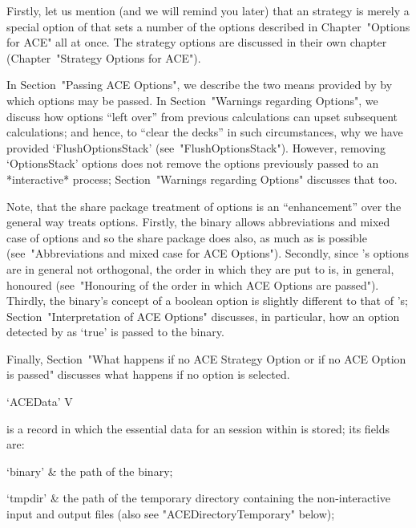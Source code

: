 Firstly, let us mention (and we will remind you later) that an  {\ACE}
strategy is merely a special option of {\ACE} that sets  a  number  of
the options described in Chapter~"Options for ACE" all  at  once.  The
strategy options are discussed in their own chapter (Chapter~"Strategy
Options for ACE").

In Section~"Passing ACE Options", we describe the two  means  provided
by {\GAP} by which {\ACE} options may be passed. In  Section~"Warnings
regarding Options", we discuss how options ``left over'' from previous
calculations can upset subsequent calculations; and hence, to  ``clear
the  decks''   in   such   circumstances,   why   we   have   provided
`FlushOptionsStack'   (see~"FlushOptionsStack").   However,   removing
`OptionsStack' options does not remove the options  previously  passed
to  an  *interactive*  {\ACE}  process;  Section~"Warnings   regarding
Options" discusses that too.

Note, that the  {\ACE}  share  package  treatment  of  options  is  an
``enhancement'' over the general way {\GAP} treats  options.  Firstly,
the {\ACE} binary allows abbreviations and mixed case of  options  and
so the {\ACE}  share  package  does  also,  as  much  as  is  possible
(see~"Abbreviations and mixed case for ACE Options"). Secondly,  since
{\ACE}'s options are in general not orthogonal,  the  order  in  which
they are put to {\ACE} is, in general, honoured (see~"Honouring of the
order in which ACE Options are passed"). Thirdly, the {\ACE}  binary's
concept of a boolean option is slightly different to that of {\GAP}'s;
Section~"Interpretation of ACE Options" discusses, in particular,  how
an option detected by {\GAP} as `true' is passed to the {\ACE} binary.

Finally, Section~"What happens if no ACE Strategy Option or if no  ACE
Option is passed" discusses what happens if no option is selected.


\>`ACEData' V

is a {\GAP} record in which the essential data for an  {\ACE}  session
within {\GAP} is stored; its fields are:

\beginitems

\quad`binary' & the path of the {\ACE} binary;

\quad`tmpdir' & the path of the  temporary  directory  containing  the
non-interactive   {\ACE}   input   and   output   files   (also    see
"ACEDirectoryTemporary" below);

